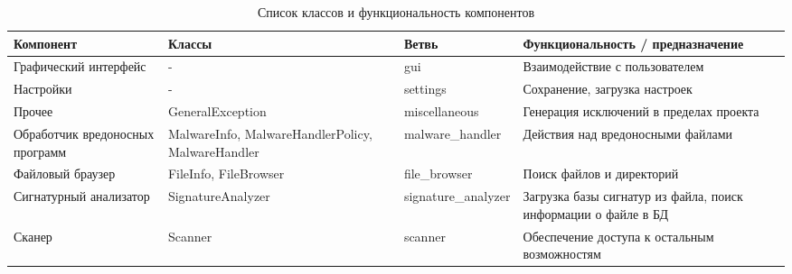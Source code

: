\begin{table}[h]
\centering
\begin{tabular}{|p{25mm}|p{4cm}|l|p{4cm}|}
\hline
Компонент & Классы & Ветвь & Функциональность / предназначение \\
\hline
Графический интерфейс & - & gui & Взаимодействие с пользователем \\
\hline
Настройки & - & settings & Сохранение, загрузка настроек \\
\hline
Прочее & GeneralException & miscellaneous & Генерация исключений в пределах проекта \\
\hline
Обработчик вредоносных программ & MalwareInfo, MalwareHandlerPolicy, MalwareHandler & malware\_handler & Действия над вредоносными файлами \\
\hline
Файловый браузер & FileInfo, FileBrowser & file\_browser & Поиск файлов и директорий \\
\hline
Сигнатурный анализатор & SignatureAnalyzer & signature\_analyzer & Загрузка базы сигнатур из файла, поиск информации о файле в БД \\
\hline
Сканер & Scanner & scanner & Обеспечение доступа к остальным возможностям \\
\hline
\end{tabular}
\caption{Список классов и функциональность компонентов}
\label{table:components}
\end{table}
